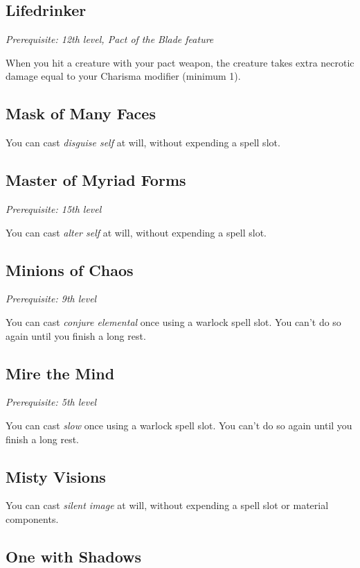 \subsection{Lifedrinker}

\textit{Prerequisite: 12th level, Pact of the Blade feature}

When you hit a creature with your pact weapon, the creature takes extra necrotic damage equal to your Charisma modifier (minimum 1).

\subsection{Mask of Many Faces}

You can cast \textit{disguise self} at will, without expending a spell slot.

\subsection{Master of Myriad Forms}

\textit{Prerequisite: 15th level}

You can cast \textit{alter self} at will, without expending a spell slot.

\subsection{Minions of Chaos}

\textit{Prerequisite: 9th level}

You can cast \textit{conjure elemental} once using a warlock spell slot. You can't do so again until you finish a long rest.

\subsection{Mire the Mind}

\textit{Prerequisite: 5th level}

You can cast \textit{slow} once using a warlock spell slot. You can't do so again until you finish a long rest.

\subsection{Misty Visions}

You can cast \textit{silent image} at will, without expending a spell slot or material components.

\subsection{One with Shadows}

